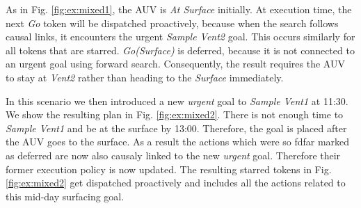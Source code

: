 As in Fig. \ref{fig:ex:mixed1}, the AUV is {\em At Surface} initially.
At execution time, the next {\em Go} token will be dispatched
proactively, because when the search follows causal links, it
encounters the urgent {\em Sample Vent2} goal.  This occurs similarly
for all tokens that are starred. {\em Go(Surface)} is deferred,
because it is not connected to an urgent goal using forward
search. Consequently, the result requires the AUV to stay at {\em
  Vent2} rather than heading to the {\em Surface} immediately.


In this scenario we then introduced a new {\em urgent} goal to {\em
  Sample Vent1} at 11:30. We show the resulting plan in
Fig. \ref{fig:ex:mixed2}. There is not enough time to {\em Sample
  Vent1} and be at the surface by 13:00. Therefore, the goal is placed
after the AUV goes to the surface. As a result the actions which were
so fdfar marked as deferred are now also causaly linked to the new
{\em urgent} goal. Therefore their former execution policy is now
updated. The resulting starred tokens in Fig. \ref{fig:ex:mixed2} get
dispatched proactively and includes all the actions related to this
mid-day surfacing goal.

